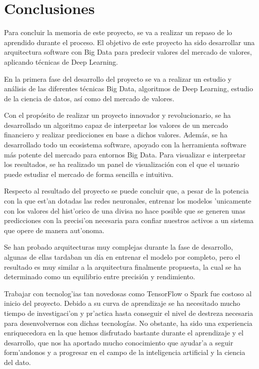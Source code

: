 \chapter{Conclusiones}\label{conclusiones}

Para concluir la memoria de este proyecto, se va a realizar un repaso de lo aprendido durante el proceso. El objetivo de este proyecto ha sido desarrollar una arquitectura software con Big Data para predecir valores del mercado de valores, aplicando técnicas de Deep Learning. 

En la primera fase del desarrollo del proyecto se va a realizar un estudio y análisis de las diferentes técnicas Big Data, algoritmos de Deep Learning, estudio de la ciencia de datos, así como del mercado de valores.

Con el propósito de realizar un proyecto innovador y revolucionario, se ha desarrollado un algoritmo capaz de interpretar los valores de un mercado financiero y realizar predicciones en base a dichos valores. Además, se ha desarrollado todo un ecosistema software, apoyado con la herramienta software más potente del mercado para entornos Big Data. Para visualizar e interpretar los resultados, se ha realizado un panel de visualización con el que el usuario puede estudiar el mercado de forma sencilla e intuitiva. 



Respecto al resultado del proyecto se puede concluir que, a pesar de la potencia con la que est'an dotadas las redes neuronales, entrenar los modelos 'unicamente con los valores del hist'orico de una divisa no hace posible que se generen unas predicciones con la precisi'on necesaria para confiar nuestros activos a un sistema que opere de manera aut'onoma.

Se han probado arquitecturas muy complejas durante la fase de desarrollo, algunas de ellas tardaban un día en entrenar el modelo por completo, pero el resultado es muy similar a la arquitectura finalmente propuesta, la cual se ha determinado como un equilibrio entre precisión y rendimiento.

Trabajar con tecnolog'ias tan novedosas como TensorFlow o Spark fue costoso al inicio del proyecto. Debido a su curva de aprendizaje se ha necesitado mucho tiempo de investigaci'on y pr'actica hasta conseguir el nivel de destreza necesaria para desenvolvernos con dichas tecnologías. 
No obstante, ha sido una experiencia enriquecedora en la que hemos disfrutado bastante durante el aprendizaje y el desarrollo, que nos ha aportado mucho conocimiento que ayudar'a a seguir form'andonos y a progresar en el campo de la inteligencia artificial y la ciencia del dato.


	


